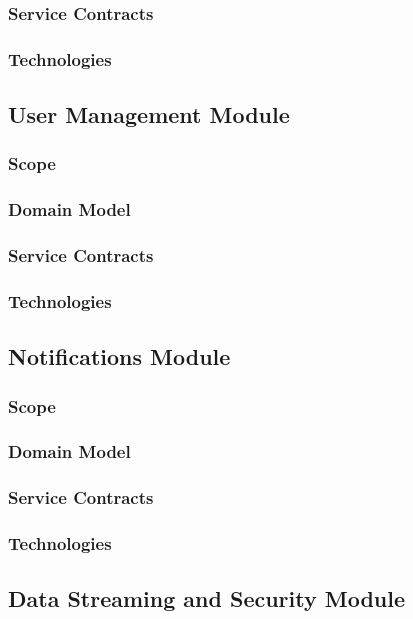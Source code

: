 \documentclass{article}
\begin{document}
		\subsubsection{Service Contracts}
		\subsubsection{Technologies}

	\subsection{User Management Module}
		\subsubsection{Scope}
		\subsubsection{Domain Model}
		\subsubsection{Service Contracts}
		\subsubsection{Technologies}
		
	\subsection{Notifications Module}
		\subsubsection{Scope}
		\subsubsection{Domain Model}
		\subsubsection{Service Contracts}
		\subsubsection{Technologies}
		
	\subsection{Data Streaming and Security Module}
\end{document}
